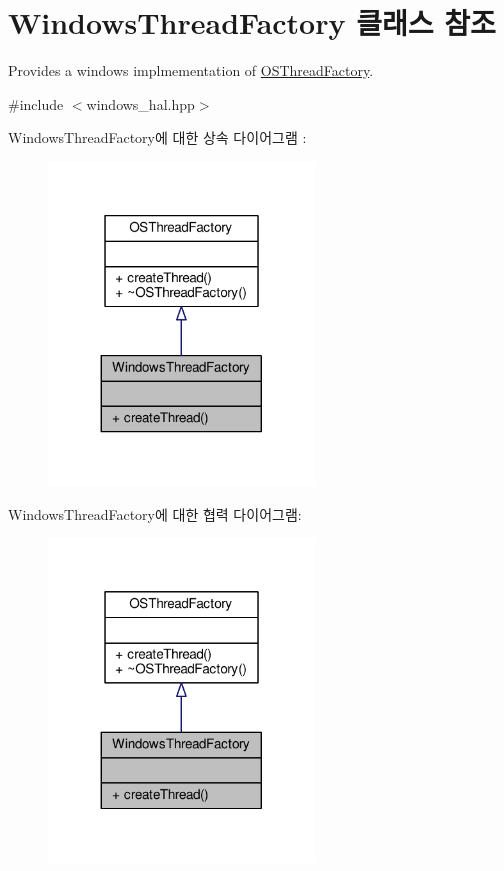 \hypertarget{class_windows_thread_factory}{}\section{Windows\+Thread\+Factory 클래스 참조}
\label{class_windows_thread_factory}


Provides a windows implmementation of \hyperlink{class_o_s_thread_factory}{O\+S\+Thread\+Factory}.  




{\ttfamily \#include $<$windows\+\_\+hal.\+hpp$>$}



Windows\+Thread\+Factory에 대한 상속 다이어그램 \+: 
\nopagebreak
\begin{figure}[H]
\begin{center}
\leavevmode
\includegraphics[width=200pt]{class_windows_thread_factory__inherit__graph}
\end{center}
\end{figure}


Windows\+Thread\+Factory에 대한 협력 다이어그램\+:
\nopagebreak
\begin{figure}[H]
\begin{center}
\leavevmode
\includegraphics[width=200pt]{class_windows_thread_factory__coll__graph}
\end{center}
\end{figure}
